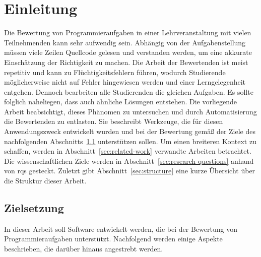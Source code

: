 \chapter{Einleitung}\label{ch:introduction}

Die Bewertung von Programmieraufgaben in einer Lehrveranstaltung mit vielen Teilnehmenden kann sehr aufwendig sein.
Abhängig von der Aufgabenstellung müssen viele Zeilen Quellcode gelesen und verstanden werden, um eine akkurate Einschätzung der Richtigkeit zu machen.
Die Arbeit der Bewertenden ist meist repetitiv und kann zu Flüchtigkeitsfehlern führen, wodurch Studierende möglicherweise nicht auf Fehler hingewiesen werden und einer Lerngelegenheit entgehen.
Dennoch bearbeiten alle Studierenden die gleichen Aufgaben.
Es sollte folglich naheliegen, dass auch ähnliche Lösungen entstehen.
Die vorliegende Arbeit beabsichtigt, dieses Phänomen zu untersuchen und durch Automatisierung die Bewertenden zu entlasten.
Sie beschreibt Werkzeuge, die für diesen Anwendungszweck entwickelt wurden und bei der Bewertung gemäß der Ziele des nachfolgenden Abschnitts~\ref{sec:goals} unterstützen sollen.
Um einen breiteren Kontext zu schaffen, werden in Abschnitt~\ref{sec:related-work} verwandte Arbeiten betrachtet.
Die wissenschaftlichen Ziele werden in Abschnitt~\ref{sec:research-questions} anhand von \acp{rq} gesteckt.
Zuletzt gibt Abschnitt~\ref{sec:structure} eine kurze Übersicht über die Struktur dieser Arbeit.

\section{Zielsetzung}\label{sec:goals}

In dieser Arbeit soll Software entwickelt werden, die bei der Bewertung von Programmieraufgaben unterstützt.
Nachfolgend werden einige Aspekte beschrieben, die darüber hinaus angestrebt werden.

